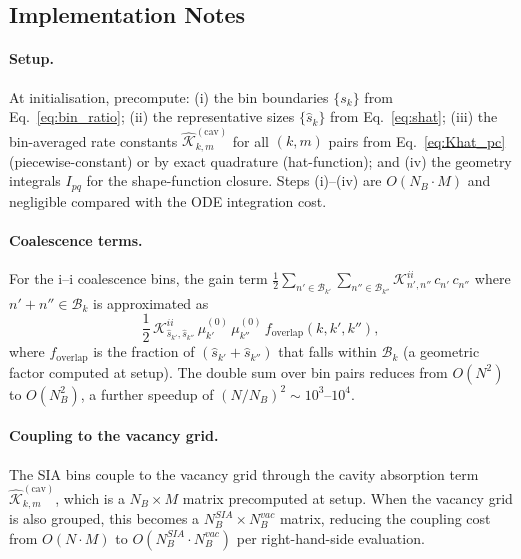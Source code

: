 \subsection{Implementation Notes}
\label{sec:grouping_impl}

\paragraph{Setup.}
At initialisation, precompute: (i) the bin boundaries $\{s_k\}$
from Eq.~\eqref{eq:bin_ratio}; (ii) the representative sizes
$\{\hat{s}_k\}$ from Eq.~\eqref{eq:shat}; (iii) the bin-averaged
rate constants $\hat{\mathcal{K}}_{k,m}^{(\mathrm{cav})}$ for all
$(k,m)$ pairs from Eq.~\eqref{eq:Khat_pc} (piecewise-constant) or
by exact quadrature (hat-function); and (iv) the geometry integrals
$I_{pq}$ for the shape-function closure. Steps (i)--(iv) are
$O(N_B \cdot M)$ and negligible compared with the ODE integration
cost.

\paragraph{Coalescence terms.}
For the i--i coalescence bins, the gain term
$\frac{1}{2}\sum_{n'\in\mathcal{B}_{k'}} \sum_{n''\in\mathcal{B}_{k''}}
\mathcal{K}_{n',n''}^{ii}\,c_{n'}\,c_{n''}$ where $n'+n''\in\mathcal{B}_k$
is approximated as
\begin{equation}\label{eq:coal_binned}
    \frac{1}{2}\,\mathcal{K}_{\hat{s}_{k'},\hat{s}_{k''}}^{ii}\,
    \mu_{k'}^{(0)}\,\mu_{k''}^{(0)}\,
    f_{\mathrm{overlap}}(k,k',k''),
\end{equation}
where $f_{\mathrm{overlap}}$ is the fraction of $(\hat{s}_{k'} +
\hat{s}_{k''})$ that falls within $\mathcal{B}_k$ (a geometric
factor computed at setup). The double sum over bin pairs reduces
from $O(N^2)$ to $O(N_B^2)$, a further speedup of
$(N/N_B)^2 \sim 10^3$--$10^4$.

\paragraph{Coupling to the vacancy grid.}
The SIA bins couple to the vacancy grid through the cavity absorption
term $\hat{\mathcal{K}}_{k,m}^{(\mathrm{cav})}$, which is a
$N_B \times M$ matrix precomputed at setup. When the vacancy grid is
also grouped, this becomes a $N_B^{SIA} \times N_B^{vac}$ matrix,
reducing the coupling cost from $O(N \cdot M)$ to
$O(N_B^{SIA} \cdot N_B^{vac})$ per right-hand-side evaluation.


